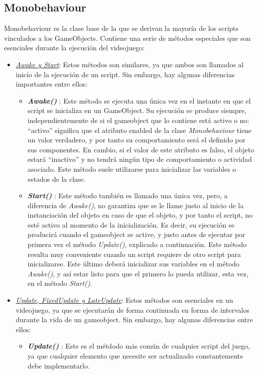 \subsection{Monobehaviour} \label{Monobehaviour}
Monobehaviour \cite{doc:MonoBehaviour} es la clase base de la que se derivan la mayoría de los scripts vinculados a los GameObjects. Contiene una serie de métodos especiales que son esenciales durante la ejecución del videojuego:
\begin{itemize}
\tightlist
\item \underline{\textit{Awake y Start}}: Estos métodos son similares, ya que ambos son llamados al inicio de la ejecución de un script. Sin embargo, hay algunas diferencias importantes entre ellos:
    \begin{itemize}
    \tightlist
    \item \textbf{\textit{Awake()}} \cite{doc:Awake}: Este método se ejecuta una única vez en el instante en que el script se inicializa en un GameObject. Su ejecución se produce siempre, independientemente de si el gameobject que lo contiene está activo o no: ``activo'' significa que el atributo enabled de la clase \textit{Monobehaviour} tiene un valor verdadero, y por tanto su comportamiento será el definido por sus componentes. En cambio, si el valor de este atributo es falso, el objeto estará ``inactivo'' y no tendrá ningún tipo de comportamiento o actividad asociado. Este método suele utilizarse para inicializar las variables o estados de la clase.
    \item \textbf{\textit{Start()}} \cite{doc:Start}: Este método también es llamado una única vez, pero, a diferencia de \textit{Awake()}, no garantiza que se le llame justo al inicio de la instanciación del objeto en caso de que el objeto, y por tanto el script, no esté activo al momento de la inicialización. Es decir, su ejecución se producirá cuando el gameobject se active, y justo antes de ejecutar por primera vez el método \textit{Update()}, explicado a continuación. Este método resulta muy conveniente cuando un script requiere de otro script para inicializarse. Este último deberá inicializar sus variables en el método \textit{Awake()}, y así estar listo para que el primero lo pueda utilizar, esta vez, en el método \textit{Start()}.
    \end{itemize}
\item \underline{\textit{Update, FixedUpdate y LateUpdate}}: Estos métodos son esenciales en un videojuego, ya que se ejecutarán de forma continuada en forma de intervalos durante la vida de un gameobject. Sin embargo, hay algunas diferencias entre ellos:
    \begin{itemize}
    \tightlist
    \item \textbf{\textit{Update()}} \cite{doc:Update}: Este es el métdodo más común de cualquier script del juego, ya que cualquier elemento que necesite ser actualizado constantemente debe implementarlo.
    

\end{itemize}
\end{itemize}
